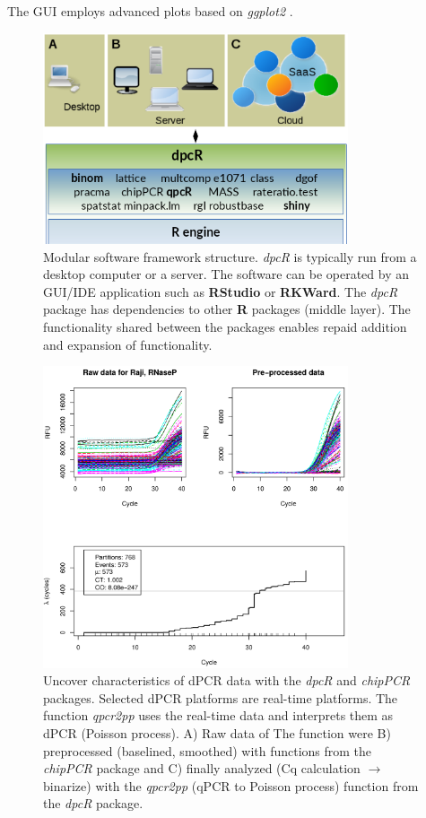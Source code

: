 \documentclass[a4,center,fleqn]{NAR}
\begin{document}
The GUI employs advanced plots based on \textit{ggplot2} \cite{kahle_wickham_2013}.

\begin{figure}[t]
\begin{center}
\includegraphics[width=9cm]{dpcR_implementation_1.png}
\end{center}
\caption{Modular software framework structure. \textit{dpcR} is typically run from a 
desktop computer or a server. The software can be operated by an GUI/IDE 
application such as \textbf{RStudio} or \textbf{RKWard}. The \textit{dpcR} 
package has dependencies to other \textbf{R} packages (middle layer). The 
functionality shared between the packages enables repaid addition and expansion 
of functionality.} 
\label{dpcR_implementation_1}
\end{figure}

\begin{figure}[t]
\begin{center}
\includegraphics[width=9cm]{qpcr2pp_1.png}
\end{center}
\caption{Uncover characteristics of dPCR data with the \textit{dpcR} and \textit{chipPCR} packages. 
Selected dPCR platforms are real-time platforms. The function \textit{qpcr2pp} uses the 
real-time data and interprets them as dPCR (Poisson process). A) Raw data of The 
function were B) preprocessed (baselined, smoothed) with functions from the 
\textit{chipPCR} package and C) finally analyzed (Cq calculation $\rightarrow$ binarize) with the 
\textit{qpcr2pp} (qPCR to Poisson process) function from the \textit{dpcR} package.} 
\label{dpcR_implementation_1}
\end{figure}
\end{document}

